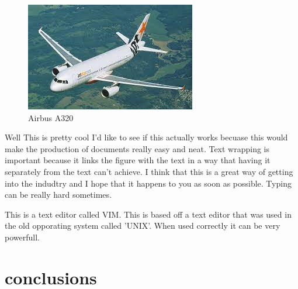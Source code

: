 \documentclass[a4paper]{report}
\begin{document}
\begin{figure}
\includegraphics[width=.5\textwidth]{picture.jpg}
\caption{Airbus A320}
\end{figure}

Well This is pretty cool I'd like to see if this actually works becuase this would make the production of documents really easy and neat. Text wrapping is important because it links the figure with the text in a way that having it separately from the text can't achieve. I think  that this is a great way of getting into the indudtry and I hope that it happens to you as soon as possible. Typing can be really hard sometimes. 

This is a text editor called VIM. This is based off a text editor that was used in the old opporating system called 'UNIX'. When used correctly it can be very powerfull.  
\blindtext[5
]
\chapter{conclusions}

\appendix
\end{document}
